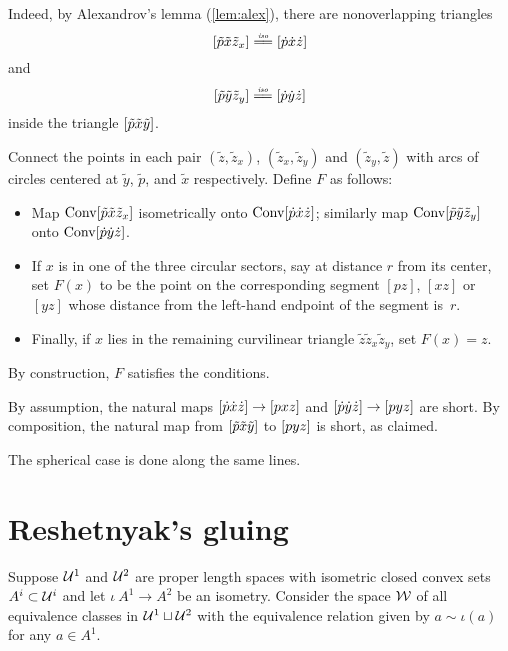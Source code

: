 Indeed, by Alexandrov's lemma (\ref{lem:alex}), 
there are nonoverlapping triangles 
\[\trig{\tilde p}{\tilde x}{\tilde z_x}\iso\trig {\dot p}{\dot x}{\dot z}\] 
and 
\[\trig{\tilde p}{\tilde y}{\tilde z_y}\iso\trig {\dot p}{\dot y}{\dot z}\]
inside the  triangle $[\tilde p\tilde x\tilde y]$.

Connect  the points in each pair
$(\tilde z,\tilde z_x)$, 
$(\tilde z_x,\tilde z_y)$ 
and $(\tilde z_y,\tilde z)$ 
with arcs of circles centered at 
$\tilde y$, $\tilde p$, and $\tilde x$ respectively. 
Define $F$ as follows:
\begin{itemize}

\item Map  $\mathop{\rm Conv}\nolimits[\tilde p\tilde x\tilde z_x]$ isometrically onto  $\mathop{\rm Conv}\nolimits[\dot p\dot x\dot z]$;
similarly map $\mathop{\rm Conv}\nolimits [\tilde p\tilde y\tilde z_y]$ onto $\mathop{\rm Conv}\nolimits [\dot p\dot y\dot z]$.

\item If $x$ is in one of the three circular sectors, say at distance $r$ from its center, set $F(x)$ to be the point on the corresponding segment 
$[p z]$, 
$[x z]$ 
or $[y z]$ whose distance from the left-hand endpoint of the segment is~$r$.

\item Finally, if $x$ lies in the remaining curvilinear triangle $\tilde z \tilde z_x \tilde z_y$, 
set $F(x) = z$. 
\end{itemize}
By construction, $F$ satisfies the conditions.

By assumption, the natural maps $[\dot p\dot x\dot z]\to[pxz]$ and $[\dot p\dot y\dot z]\to[pyz]$ are short.  
By composition,  the natural map from $[\tilde  p\tilde  x\tilde  y]$ to $[pyz]$ is short, as claimed.

The spherical case is done along the same lines.
\qeds

\section{Reshetnyak's gluing}\label{sec:cba-gluing}

Suppose 
$\mathcal{U}^1$ and $\mathcal{U}^2$ are proper length spaces 
with isometric closed convex sets $A^i\subset\mathcal{U}^i$ and let $\iota\:A^1\to A^2$ be an isometry.
Consider the space $\mathcal{W}$ of all equivalence classes in $\mathcal{U}^1\sqcup\mathcal{U}^2$ with the equivalence relation given by $a\sim\iota(a)$ for any $a\in A^1$.

